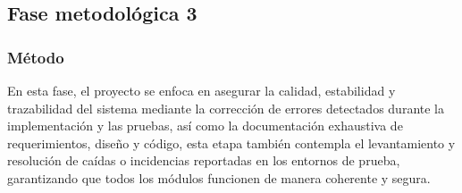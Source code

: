 \documentclass[12pt,a4paper]{article}
\begin{document}
\subsection{Fase metodológica 3}
\subsubsection{Método}
En esta fase, el proyecto se enfoca en asegurar la calidad, estabilidad y trazabilidad del sistema mediante la corrección de errores detectados durante la implementación y las pruebas, así como la documentación exhaustiva de requerimientos, diseño y código, esta etapa también contempla el levantamiento y resolución de caídas o incidencias reportadas en los entornos de prueba, garantizando que todos los módulos funcionen de manera coherente y segura.
\end{document}
